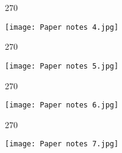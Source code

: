 \documentclass[11pt]{article}
\begin{document}
\begin{turn}{270}

  
\texttt{[image: Paper notes 4.jpg]}

\end{turn}
\begin{turn}{270}

  
\texttt{[image: Paper notes 5.jpg]}

\end{turn}
\begin{turn}{270}

  
\texttt{[image: Paper notes 6.jpg]}

\end{turn}
\begin{turn}{270}

  
\texttt{[image: Paper notes 7.jpg]}

\end{turn}


\nocite {*}


\end{document}
